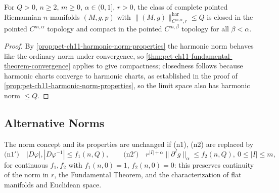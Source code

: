 \begin{corollary}
  \label{cor:pet-ch11-harmonic-norm-class-compact}
  For $Q>0$, $n\ge2$, $m\ge0$, $\alpha\in(0,1]$, $r>0$, the class of complete
  pointed Riemannian $n$-manifolds $(M,g,p)$ with
  $\|(M,g)\|^{\mathrm{har}}_{C^{m,\alpha},r}\le Q$ is closed in the pointed
  $C^{m,\alpha}$ topology and compact in the pointed $C^{m,\beta}$ topology
  for all $\beta<\alpha$.
\end{corollary}
\begin{proof}
  By \cref{prop:pet-ch11-harmonic-norm-properties} the harmonic norm behaves
  like the ordinary norm under convergence, so
  \cref{thm:pet-ch11-fundamental-theorem-convergence} applies to give
  compactness; closedness follows because harmonic charts converge to
  harmonic charts, as established in the proof of
  \cref{prop:pet-ch11-harmonic-norm-properties}, so the limit space also has
  harmonic norm $\le Q$.
\end{proof}

\subsection{Alternative Norms}

\begin{remark}
  \label{rem:pet-ch11-alternative-norm-conditions}
  The norm concept and its properties are unchanged if (n1), (n2) are
  replaced by
  \[
    \text{(n1$'$)}\quad|D\varphi|,|D\varphi^{-1}|\le f_1(n,Q),\qquad
    \text{(n2$'$)}\quad r^{|I|+\alpha}\|\partial^Ig\|_\alpha\le f_2(n,Q),\ 0\le|I|\le m,
  \]
  for continuous $f_1,f_2$ with $f_1(n,0)=1$, $f_2(n,0)=0$: this preserves
  continuity of the norm in $r$, the Fundamental Theorem, and the
  characterization of flat manifolds and Euclidean space.
\end{remark}


